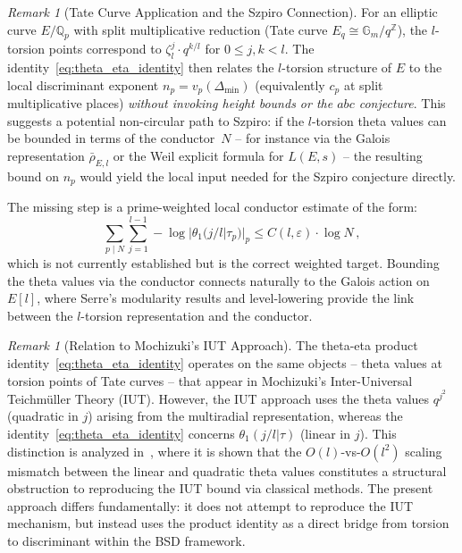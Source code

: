 \documentclass[aps,prd,twocolumn,superscriptaddress,nofootinbib,floatfix]{revtex4-2}
\theoremstyle{definition}
\theoremstyle{remark}
\newtheorem{remark}[theorem]{Remark}
\begin{document}
\begin{remark}[Tate Curve Application and the Szpiro Connection]
\label{rem:tate_szpiro}
For an elliptic curve $E/\mathbb{Q}_p$ with split multiplicative reduction (Tate curve $E_q \cong \mathbb{G}_m/q^{\mathbb{Z}}$), the $l$-torsion points correspond to $\zeta_l^j \cdot q^{k/l}$ for $0 \leq j,k < l$.  The identity~\eqref{eq:theta_eta_identity} then relates the $l$-torsion structure of $E$ to the local discriminant exponent $n_p=v_p(\Delta_{\min})$ (equivalently $c_p$ at split multiplicative places) \textit{without invoking height bounds or the $abc$ conjecture}.  This suggests a potential non-circular path to Szpiro: if the $l$-torsion theta values can be bounded in terms of the conductor~$N$ -- for instance via the Galois representation $\bar{\rho}_{E,l}$ or the Weil explicit formula for $L(E,s)$ -- the resulting bound on $n_p$ would yield the local input needed for the Szpiro conjecture directly.

The missing step is a prime-weighted local conductor estimate of the form:
\begin{equation}
\sum_{p\mid N}\sum_{j=1}^{l-1}-\log|\theta_1(j/l|\tau_p)|_p
\leq C(l,\varepsilon)\cdot\log N\,,
\label{eq:theta_conductor_bound}
\end{equation}
which is not currently established but is the correct weighted target.  Bounding the theta values via the conductor connects naturally to the Galois action on $E[l]$, where Serre's modularity results and level-lowering provide the link between the $l$-torsion representation and the conductor.
\end{remark}

\begin{remark}[Relation to Mochizuki's IUT Approach]
\label{rem:iut_comparison}
The theta-eta product identity~\eqref{eq:theta_eta_identity} operates on the same objects -- theta values at torsion points of Tate curves -- that appear in Mochizuki's Inter-Universal Teichmüller Theory (IUT).  However, the IUT approach uses the theta values $q^{j^2}$ (quadratic in $j$) arising from the multiradial representation, whereas the identity~\eqref{eq:theta_eta_identity} concerns $\theta_1(j/l|\tau)$ (linear in $j$).  This distinction is analyzed in~\cite{GeigerIUT2026}, where it is shown that the $O(l)$-vs-$O(l^2)$ scaling mismatch between the linear and quadratic theta values constitutes a structural obstruction to reproducing the IUT bound via classical methods.  The present approach differs fundamentally: it does not attempt to reproduce the IUT mechanism, but instead uses the product identity as a direct bridge from torsion to discriminant within the BSD framework.
\end{remark}
\end{document}
